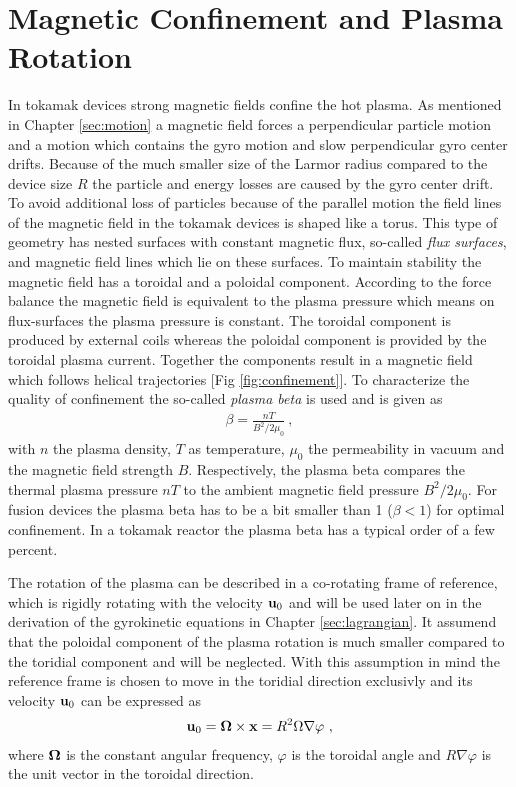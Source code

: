 \newpage
\section{Magnetic Confinement and Plasma Rotation}
\label{sec:confinement}

In tokamak devices strong magnetic fields confine the hot plasma. As mentioned in Chapter \ref{sec:motion} a magnetic field forces a perpendicular particle motion and a motion which contains the gyro motion and slow perpendicular gyro center drifts. Because of the much smaller size of the Larmor radius compared to the device size $R$ the particle and energy losses are caused by the gyro center drift. To avoid additional loss of particles because of the parallel motion the field lines of the magnetic field in the tokamak devices is shaped like a torus. This type of geometry has nested surfaces with constant magnetic flux, so-called \textit{flux surfaces}, and magnetic field lines which lie on these surfaces. To maintain stability the magnetic field has a toroidal and a poloidal component. According to the force balance the magnetic field is equivalent to the plasma pressure which means on flux-surfaces the plasma pressure is constant. \cite{Stroth2011, Wesson2011} The toroidal component is produced by external coils whereas the poloidal component is provided by the toroidal plasma current. Together the components result in a magnetic field which follows helical trajectories [Fig \ref{fig:confinement}]. To characterize the quality of confinement the so-called \textit{plasma beta} is used and is given as
\begin{gather}
    \beta = \frac{nT}{B^2/2\mu_0}~,
\end{gather} 
with $n$ the plasma density, $T$ as temperature, $\mu_0$ the permeability in vacuum and the magnetic field strength $B$. Respectively, the plasma beta compares the thermal plasma pressure $nT$ to the ambient magnetic field pressure $B^2/2\mu_0 $. For fusion devices the plasma beta has to be a bit smaller than 1 ($\beta < 1$) for optimal confinement. In a tokamak reactor the plasma beta has a typical order of a few percent. \cite{Wesson2011}
\bigskip

The rotation of the plasma can be described in a co-rotating frame of reference, which is rigidly rotating with the velocity $\boldsymbol{\mathbf{u}}_0$ and will be used later on in the derivation of the gyrokinetic equations in Chapter \ref{sec:lagrangian}. It assumend that the poloidal component of the plasma rotation is much smaller compared to the toridial component and will be neglected. With this assumption in mind the reference frame is chosen to move in the toridial direction exclusivly and its velocity $\boldsymbol{\mathbf{u}}_0$ can be expressed as
\begin{gather}
    \boldsymbol{\mathbf{u}}_0 = \boldsymbol{\mathbf{\Omega}} \times \boldsymbol{\mathbf{x}} = R^2 \Omega \nabla \varphi~,
    \label{eq:rotvelocity}
\end{gather}
where $\boldsymbol{\mathbf{\Omega}}$ is the constant angular frequency, $\varphi$ is the toroidal angle and $R \nabla\varphi$ is the unit vector in the toroidal direction. 

